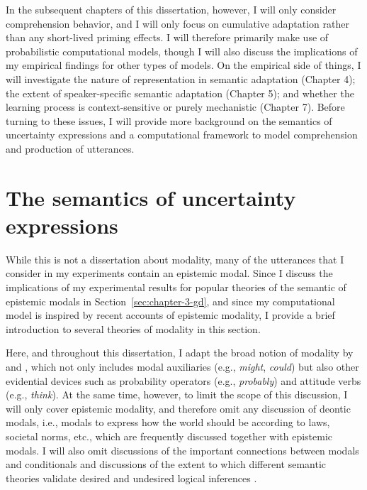 In the subsequent chapters of this dissertation, however, I will only consider comprehension behavior, and I will only focus on cumulative adaptation
rather than any short-lived priming effects. I will therefore primarily make use of probabilistic computational models, though I will also discuss the implications
of my empirical findings for other types of models. On the empirical side of things, I will investigate the nature of representation in semantic adaptation (Chapter 4);
the extent of speaker-specific semantic adaptation (Chapter 5); and whether the learning process is context-sensitive or purely mechanistic (Chapter 7). Before turning to these
issues, I will provide more background on the semantics of uncertainty expressions and a computational framework to model comprehension and production of utterances.


\section{The semantics of uncertainty expressions}

While this is not a dissertation about modality, many of the utterances that I consider in my experiments contain an epistemic modal.
Since I discuss the implications of my experimental results for popular theories of the semantic of epistemic modals in Section~\ref{sec:chapter-3-gd}, and since 
my computational model is inspired by recent accounts of epistemic modality, I provide a brief introduction to several theories of modality in this section.

Here, and throughout this dissertation, I adapt the broad notion of modality by \textcite{Portner2009} and \textcite[][Ch.2]{Kratzer2012}, which not only 
includes modal auxiliaries (e.g., \textit{might}, \textit{could}) but also other evidential devices such as probability operators 
(e.g., \textit{probably}) and attitude verbs (e.g., \textit{think}). At the same time, however, to limit the scope of this discussion,  
I will only cover epistemic modality, and therefore omit any discussion of deontic modals, i.e., modals to express how the 
world should be according to laws, societal norms, etc., which are frequently discussed together with epistemic modals.
I will also omit discussions of the important connections between modals and conditionals \cite[see, e.g.,][]{Lewis1973,Kratzer1978,Kratzer1979,Kratzer2012}
and discussions of the extent to which different semantic theories validate desired and undesired logical inferences \cite{see e.g., Yalcin2010}.

